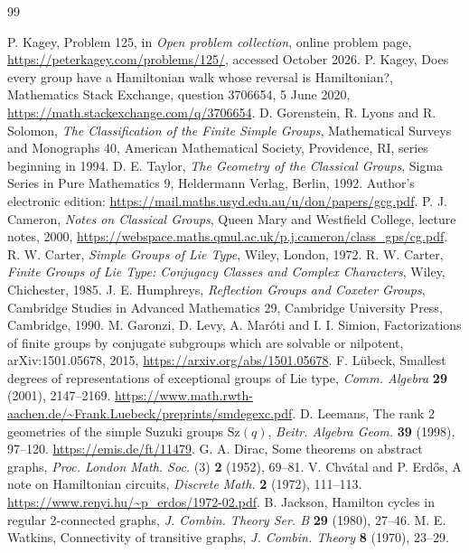 \documentclass[11pt]{article}
\theoremstyle{definition}
\newcommand{\Sz}{\mathrm{Sz}}
\begin{document}
\begin{thebibliography}{99}
\raggedright
{} P. Kagey, Problem 125, in \emph{Open problem collection}, online problem page, \url{https://peterkagey.com/problems/125/}, accessed October 2026.
 P. Kagey, Does every group have a Hamiltonian walk whose reversal is Hamiltonian?, Mathematics Stack Exchange, question 3706654, 5 June 2020, \url{https://math.stackexchange.com/q/3706654}.
 D. Gorenstein, R. Lyons and R. Solomon, \emph{The Classification of the Finite Simple Groups}, Mathematical Surveys and Monographs 40, American Mathematical Society, Providence, RI, series beginning in 1994.
 D. E. Taylor, \emph{The Geometry of the Classical Groups}, Sigma Series in Pure Mathematics 9, Heldermann Verlag, Berlin, 1992. Author's electronic edition: \url{https://mail.maths.usyd.edu.au/u/don/papers/gcg.pdf}.
 P. J. Cameron, \emph{Notes on Classical Groups}, Queen Mary and Westfield College, lecture notes, 2000, \url{https://webspace.maths.qmul.ac.uk/p.j.cameron/class_gps/cg.pdf}.
 R. W. Carter, \emph{Simple Groups of Lie Type}, Wiley, London, 1972.
 R. W. Carter, \emph{Finite Groups of Lie Type: Conjugacy Classes and Complex Characters}, Wiley, Chichester, 1985.
 J. E. Humphreys, \emph{Reflection Groups and Coxeter Groups}, Cambridge Studies in Advanced Mathematics 29, Cambridge University Press, Cambridge, 1990.
 M. Garonzi, D. Levy, A. Mar\'oti and I. I. Simion, Factorizations of finite groups by conjugate subgroups which are solvable or nilpotent, arXiv:1501.05678, 2015, \url{https://arxiv.org/abs/1501.05678}.
 F. L\"ubeck, Smallest degrees of representations of exceptional groups of Lie type, \emph{Comm. Algebra} \textbf{29} (2001), 2147--2169. \url{https://www.math.rwth-aachen.de/~Frank.Luebeck/preprints/smdegexc.pdf}.
 D. Leemans, The rank 2 geometries of the simple Suzuki groups $\Sz(q)$, \emph{Beitr. Algebra Geom.} \textbf{39} (1998), 97--120. \url{https://emis.de/ft/11479}.
 G. A. Dirac, Some theorems on abstract graphs, \emph{Proc. London Math. Soc.} (3) \textbf{2} (1952), 69--81.
 V. Chv\'atal and P. Erd\H{o}s, A note on Hamiltonian circuits, \emph{Discrete Math.} \textbf{2} (1972), 111--113. \url{https://www.renyi.hu/~p_erdos/1972-02.pdf}.
 B. Jackson, Hamilton cycles in regular 2-connected graphs, \emph{J. Combin. Theory Ser. B} \textbf{29} (1980), 27--46.
 M. E. Watkins, Connectivity of transitive graphs, \emph{J. Combin. Theory} \textbf{8} (1970), 23--29.

\end{thebibliography}
\end{document}
